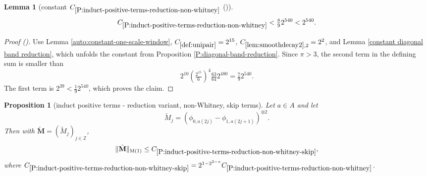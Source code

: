 \documentclass[12pt,reqno]{amsart}
\newcommand{\auto}{{({\tiny\faCar})}}
\theoremstyle{plain}
\newtheorem{lemma}[theorem]{Lemma}
\newtheorem{proposition}[theorem]{Proposition}
\numberwithin{equation}{section}
\theoremstyle{remark}
\newcommand{\uses}[1]{}
\newcommand{\usesdefs}[1]{}
\newcommand{\Z}{{\mathbb Z}}
\newcommand{\M}{\mathbf{M}}
\begin{document}
\begin{lemma}[constant $C_{\ref{P:induct-positive-terms-reduction-non-whitney}}$ \auto]\label{constant non Whitney reduction}\uses{auto:constant-one-scale-window,lem:smoothdecay2,P:diagonal-band-reduction,constant diagonal band reduction,P:induct-positive-terms-reduction-non-whitney}\usesdefs{def:unipair}
\begin{equation}\label{constant non Whitney reduction bound}
C_{\ref{P:induct-positive-terms-reduction-non-whitney}}
<\tfrac89 2^{540}<2^{540}.
\end{equation}
\end{lemma}
\begin{proof}[Proof \auto]
Use Lemma \ref{auto:constant-one-scale-window}, $C_{\ref{def:unipair}}=2^{15}$, $C_{\ref{lem:smoothdecay2},2}=2^2$, and Lemma \ref{constant diagonal band reduction}, which unfolds the constant from Proposition \ref{P:diagonal-band-reduction}. Since $\pi>3$, the second term in the defining sum is smaller than
\[
2^{10}\left(\tfrac{2^{15}}6\right)^4\tfrac{63}{64}2^{480}
=\tfrac79 2^{540}.
\]
The first term is $2^{39}<\frac19 2^{540}$, which proves the claim.
\end{proof}


\begin{proposition}[induct positive terms - reduction variant, non-Whitney, skip terms]
\label{P:induct-positive-terms-reduction-non-whitney-skip}\uses{positive terms,P:induct-positive-terms-reduction-non-whitney}\usesdefs{normalized function tuples,auto:prism-form-definition,multiplicatively spaced monotone sequences,geometric parameters,double sequence of 2D functions,kernel sequences,def:unipair}
Let $a\in A$ and let
\begin{equation}\label{auto:skipped-non-Whitney-kernel}\tilde{M}_j=({\phi}_{0,a(2j)}-{\phi}_{1,a(2j+1)})^{\otimes 2}.\end{equation}
Then with $\tilde{\M}=(\tilde{M}_j)_{j\in \Z}$,
\begin{equation}\label{E:est-skipped-terms}
\|\tilde{\M}\|_{\rm M(1)}\le C_{\ref{P:induct-positive-terms-reduction-non-whitney-skip}},
\end{equation}
where $C_{\ref{P:induct-positive-terms-reduction-non-whitney-skip}}= 2^{1-2^{2-n}} C_{\ref{P:induct-positive-terms-reduction-non-whitney}}$.
\end{proposition}
\end{document}
